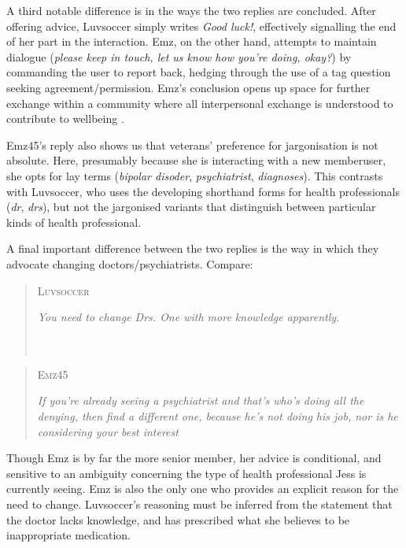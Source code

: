 \documentclass{article}
\begin{document}
A third notable difference is in the ways the two replies are concluded. After offering advice, Luvsoccer simply writes \emph{Good luck!}, effectively signalling the end of her part in the interaction. Emz, on the other hand, attempts to maintain dialogue (\emph{please keep in touch, let us know how you're doing, okay?}) by commanding the user to report back, hedging through the use of a tag question seeking agreement\slash permission. Emz's conclusion opens up space for further exchange within a community where all interpersonal exchange is understood to contribute to wellbeing \parencite[c.f.][]{althoff_counseling_2016}.%

Emz45's reply also shows us that veterans' preference for jargonisation is not absolute. Here, presumably because she is interacting with a new member{user}, she opts for lay terms (\emph{bipolar disoder}, \emph{psychiatrist}, \emph{diagnoses}). This contrasts with Luvsoccer, who uses the developing shorthand forms for health professionals (\emph{dr}, \emph{drs}), but not the jargonised variants that distinguish between particular kinds of health professional.

A final important difference between the two replies is the way in which they advocate changing doctors\slash psychiatrists. Compare:

\begin{multicols}{2}
\begin{quote}
\textsc{Luvsoccer}

\emph{You need to change Drs. One with more knowledge apparently.} ~\\~\\~\\
\end{quote}

\begin{quote}
\textsc{Emz45}

\emph{If you're already seeing a psychiatrist and that's who's doing all the denying, then find a different one, because he's not doing his job, nor is he considering your best interest}
\end{quote}
\end{multicols}
%
\noindent Though Emz is by far the more senior member, her advice is conditional, and sensitive to an ambiguity concerning the type of health professional Jess is currently seeing. Emz is also the only one who provides an explicit reason for the need to change. Luvsoccer's reasoning must be inferred from the statement that the doctor lacks knowledge, and has prescribed what she believes to be inappropriate medication. 
\end{document}
